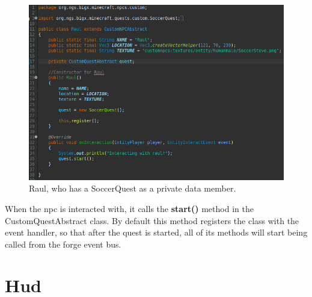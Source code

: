 \documentclass[12pt]{article}
\begin{document}
\begin{figure}[H]
	\caption{Raul, who has a SoccerQuest as a private data member.}
	\includegraphics[scale=0.3]{images/quests/RaulQuest.png}
	\centering
\end{figure}

When the npc is interacted with, it calls the {\bfseries start()} method in the CustomQuestAbstract class. By default this method registers the class with the event handler, so that after the quest is started, all of its methods will start being called from the forge event bus.


\section{Hud}
\label{sec:hud}
\end{document}
